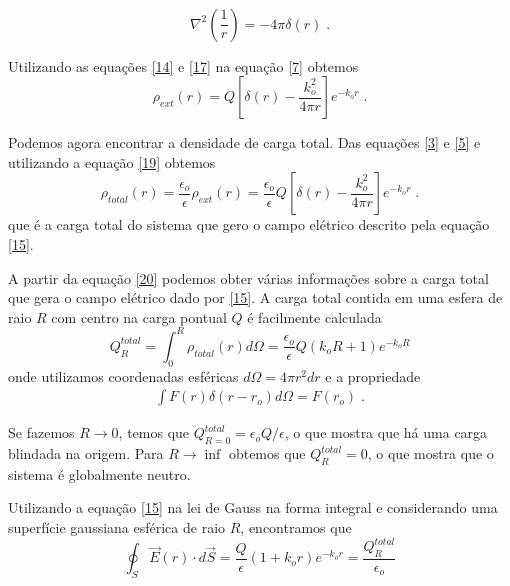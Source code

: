 \documentclass[brazilian,10.7pt,a4paper]{article}
\begin{document}
\begin{multicols}{2}
\\
\begin{equation}\label{18}
\nabla^{2}\left(\frac{1}{r}\right)=-4\pi\delta(r)\;.
\end{equation}
\par Utilizando as equações \eqref{14} e \eqref{17} na equação \eqref{7} obtemos
\\
\begin{equation}\label{19}
\rho_{ext}(r)=Q[\delta(r)-\frac{k^{2}_{o}}{4\pi r}]e^{-k_{o}r}\;.
\end{equation}
\par Podemos agora encontrar a densidade de carga total. Das equações \eqref{3} e \eqref{5} e utilizando a equação \eqref{19} obtemos
\\
\begin{equation}\label{20}
\rho_{total}(r)=\frac{\epsilon_{o}}{\epsilon}\rho_{ext}(r)=\frac{\epsilon_{o}}{\epsilon}Q[\delta(r)-\frac{k^{2}_{o}}{4\pi r}]e^{-k_{o}r}\;.
\end{equation}
que é a carga total do sistema que gero o campo elétrico descrito pela equação \eqref{15}.
\par A partir da equação \eqref{20} podemos obter várias informações sobre a carga total que gera o campo elétrico dado por \eqref{15}. A carga total contida em uma esfera de raio $R$ com centro na carga pontual $Q$ é facilmente calculada
\\
\begin{equation}\label{21}
Q^{total}_{R}=\int^{R}_{0}\rho_{total}(r)d\Omega=\frac{\epsilon_{o}}{\epsilon}Q(k_{o}R+1)e^{-k_{o}R}
\end{equation}
onde utilizamos coordenadas esféricas $d\Omega=4\pi r^{2}dr$ e a propriedade
\\
\begin{align}
\int{F(r)\delta(r-r_{o})d\Omega}=F(r_{o})\;. %
\end{align}
\par Se fazemos $R\rightarrow 0$, temos que $Q^{total}_{R=0} = \epsilon_{o}Q/\epsilon$, o que mostra que há uma carga blindada na origem. Para $R \rightarrow \inf$ obtemos que $Q^{total}_{R}=0$, o que mostra que o sistema é globalmente neutro.
\par Utilizando a equação \eqref{15} na lei de Gauss na forma integral e considerando uma superfície gaussiana esférica de raio $R$, encontramos que
\\
\begin{equation}\label{22}
\oint_{S}{\vec{E}(r)\cdot d\vec{S}}=\frac{Q}{\epsilon}(1+k_{o}r)e^{-k_{o}r}=\frac{Q^{total}_{R}}{\epsilon_{o}}

\end{equation}
\end{multicols}
\end{document}
